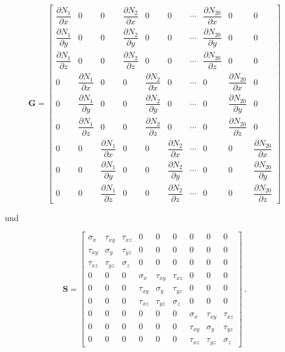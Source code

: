 \documentclass[11pt,titlepage,listof=totoc,bibliography=totoc,twoside]{scrreprt}
\begin{document}
{{\renewcommand{\arraystretch}{2.0}
\begin{equation}
\label{eq:lsolid20_G}
 \mathbf{G} = \begin{bmatrix}
    \dfrac{\partial N_1}{\partial x} & 0 & 0 & \dfrac{\partial N_2}{\partial x} & 0 & 0 & \cdots & \dfrac{\partial N_{20}}{\partial x} & 0 & 0 \\
    \dfrac{\partial N_1}{\partial y} & 0 & 0 & \dfrac{\partial N_2}{\partial y} & 0 & 0 & \cdots & \dfrac{\partial N_{20}}{\partial y} & 0 & 0 \\
    \dfrac{\partial N_1}{\partial z} & 0 & 0 & \dfrac{\partial N_2}{\partial z} & 0 & 0 & \cdots & \dfrac{\partial N_{20}}{\partial z} & 0 & 0 \\
    0 & \dfrac{\partial N_1}{\partial x} & 0 & 0 & \dfrac{\partial N_2}{\partial x} & 0 & \cdots & 0 & \dfrac{\partial N_{20}}{\partial x} & 0 \\
    0 & \dfrac{\partial N_1}{\partial y} & 0 & 0 & \dfrac{\partial N_2}{\partial y} & 0 & \cdots & 0 & \dfrac{\partial N_{20}}{\partial y} & 0 \\
    0 & \dfrac{\partial N_1}{\partial z} & 0 & 0 & \dfrac{\partial N_2}{\partial z} & 0 & \cdots & 0 & \dfrac{\partial N_{20}}{\partial z} & 0 \\
    0 & 0 & \dfrac{\partial N_1}{\partial x} & 0 & 0 & \dfrac{\partial N_2}{\partial x} & \cdots & 0 & 0 & \dfrac{\partial N_{20}}{\partial x} \\
    0 & 0 & \dfrac{\partial N_1}{\partial y} & 0 & 0 & \dfrac{\partial N_2}{\partial y} & \cdots & 0 & 0 & \dfrac{\partial N_{20}}{\partial y} \\
    0 & 0 & \dfrac{\partial N_1}{\partial z} & 0 & 0 & \dfrac{\partial N_2}{\partial z} & \cdots & 0 & 0 & \dfrac{\partial N_{20}}{\partial z}
 \end{bmatrix}
\end{equation}}

und

{{\renewcommand{\arraystretch}{2.0}
\begin{equation}
\label{eq:lsolid20_S}
 \mathbf{S} = \begin{bmatrix}
   \sigma_{x} & \tau_{xy} & \tau_{xz} & 0 & 0 & 0 & 0 & 0 & 0 \\
   \tau_{xy} & \sigma_{y} & \tau_{yz} & 0 & 0 & 0 & 0 & 0 & 0 \\
   \tau_{xz} & \tau_{yz} & \sigma_{z} & 0 & 0 & 0 & 0 & 0 & 0 \\
   0 & 0 & 0 & \sigma_{x} & \tau_{xy} & \tau_{xz} & 0 & 0 & 0 \\
   0 & 0 & 0 & \tau_{xy} & \sigma_{y} & \tau_{yz} & 0 & 0 & 0 \\
   0 & 0 & 0 & \tau_{xz} & \tau_{yz} & \sigma_{z} & 0 & 0 & 0 \\
   0 & 0 & 0 & 0 & 0 & 0 & \sigma_{x} & \tau_{xy} & \tau_{xz} \\
   0 & 0 & 0 & 0 & 0 & 0 & \tau_{xy} & \sigma_{y} & \tau_{yz} \\
   0 & 0 & 0 & 0 & 0 & 0 & \tau_{xz} & \tau_{yz} & \sigma_{z}
 \end{bmatrix} \ .
\end{equation}}

}}
\end{document}
